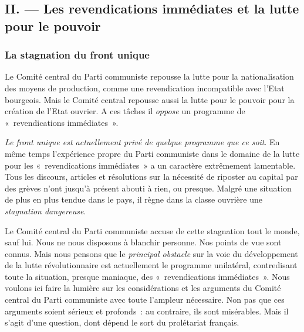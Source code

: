 \documentclass[french,twoside]{book} %
\begin{document}
\subsection[{II. — Les revendications immédiates et la lutte pour le pouvoir}]{II. — Les revendications immédiates et la lutte pour le pouvoir}
\subsubsection[{La stagnation du front unique}]{La stagnation du front unique}
\noindent Le Comité central du Parti communiste repousse la lutte pour la nationalisation des moyens de production, comme une revendication incompatible avec l’Etat bourgeois. Mais le Comité central repousse aussi la lutte pour le pouvoir pour la création de l’Etat ouvrier. A ces tâches il \emph{oppose} un programme de « revendications immédiates ».\par
\emph{Le front unique est actuellement privé de quelque programme que ce soit}. En même temps l’expérience propre du Parti communiste dans le domaine de la lutte pour les « revendications immédiates » a un caractère extrêmement lamentable. Tous les discours, articles et résolutions sur la nécessité de riposter au capital par des grèves n’ont  jusqu’à présent abouti à rien, ou presque. Malgré une situation de plus en plus tendue dans le pays, il règne dans la classe ouvrière une \emph{stagnation dangereuse}.\par
Le Comité central du Parti communiste accuse de cette stagnation tout le monde, sauf lui. Nous ne nous disposons à blanchir personne. Nos points de vue sont connus. Mais nous pensons que le \emph{principal obstacle} sur la voie du développement de la lutte révolutionnaire est actuellement le programme unilatéral, contredisant toute la situation, presque maniaque, des « revendications immédiates ». Nous voulons ici faire la lumière sur les considérations et les arguments du Comité central du Parti communiste avec toute l’ampleur nécessaire. Non pas que ces arguments soient sérieux et profonds : au contraire, ils sont misérables. Mais il s’agit d’une question, dont dépend le sort du prolétariat français.
\end{document}
